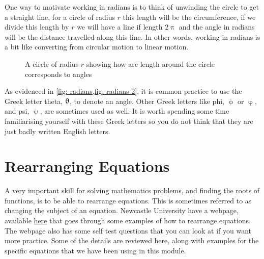One way to motivate working in radians is to think of unwinding the circle to get a straight line, for a circle of radius $r$ this length will be the circumference, if we divide this length by $r$ we will have a line if length $2\uppi$ and the angle in radians will be the distance travelled along this line. In other words, working in radians is a bit like converting from circular motion to linear motion.

\begin{figure}[ht]
    \centering
    \caption{A circle of radius $r$ showing how arc length around the circle corresponds to angles}
        \label{fig: radians 2}
\end{figure}

As evidenced in \cref{fig: radians,fig: radians 2}, it is common practice to use the Greek letter theta, $\uptheta$, to denote an angle. Other Greek letters like phi, $\upphi$ or $\upvarphi$, and psi, $\uppsi$, are sometimes used as well. It is worth spending some time familiarising yourself with these Greek letters so you do not think that they are just badly written English letters.

\section{Rearranging Equations}
\label{sec: rearranging}
A very important skill for solving mathematics problems, and finding the roots of functions, is to be able to rearrange equations. This is sometimes referred to as changing the subject of an equation. Newcastle University have a webpage, available \href{https://www.mas.ncl.ac.uk/ask/numeracy-maths-statistics/core-mathematics/pure-maths/algebra/rearranging-equations.html}{here} that goes through some examples of how to rearrange equations. The webpage also has some self test questions that you can look at if you want more practice. Some of the details are reviewed here, along with examples for the specific equations that we have been using in this module.\\


